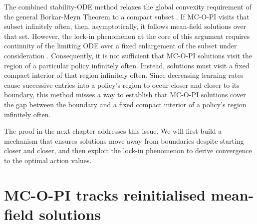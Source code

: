 The combined stability-ODE method relaxes the global convexity requirement of the general Borkar-Meyn Theorem to a compact subset \cite[Section~5.4]{Kushner2003StochasticApplications}.
If MC-O-PI visits that subset infinitely often, then, asymptotically, it follows mean-field solutions over that set.
However, the lock-in phenomenon at the core of this argument requires
continuity of the limiting ODE over a fixed enlargement of the subset under consideration \citep[Theorem 2.1]{Borkar2002OnApproximation}.
Consequently, it is not sufficient that MC-O-PI solutions visit the region of a particular policy infinitely often. Instead, solutions must visit a fixed compact interior of that region infinitely often.
Since decreasing learning rates cause successive entries into a policy’s region to occur closer and closer to its boundary,
this method misses a way to establish that MC-O-PI solutions cover the gap between the boundary and a fixed compact interior of a policy's region infinitely often.


The proof in the next chapter addresses this issue.
We will first build a mechanism that ensures solutions move away from boundaries despite starting closer and closer,
and then exploit the lock-in phenomenon 
to derive convergence to the optimal action values. 





\section{MC-O-PI tracks reinitialised mean-field solutions}
\label{sec: track mean field}

